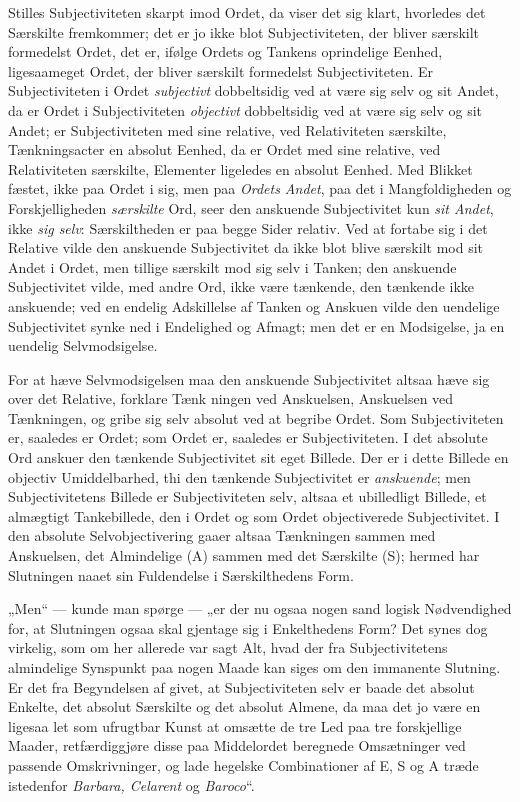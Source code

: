 \documentclass[12pt]{book}
\newcommand{\opage}[1]{\marginnote{\footnotesize\textit{[#1]}}}
\begin{document}
Stilles Subjectiviteten skarpt imod Ordet, da viser det sig klart, hvorledes det Særskilte fremkommer; det er jo ikke blot Subjectiviteten, der bliver særskilt formedelst Ordet, det er, ifølge Ordets og Tankens oprindelige Eenhed, ligesaameget Ordet, der bliver særskilt formedelst Subjectiviteten. Er Subjectiviteten i Ordet \emph{subjectivt} dobbeltsidig ved at være sig selv og sit Andet, da er Ordet i Subjectiviteten \emph{objectivt} dobbeltsidig ved at være sig selv og sit Andet; er Subjectiviteten med sine relative, ved Relativiteten særskilte, Tænkningsacter en absolut Eenhed, da er Ordet med sine relative, ved Relativiteten særskilte, Elementer ligeledes en absolut Eenhed. Med Blikket fæstet, ikke paa Ordet i sig, men paa \emph{Ordets Andet}, paa det i Mangfoldigheden og Forskjelligheden \emph{særskilte} Ord, seer den anskuende Subjectivitet kun \emph{sit Andet}, ikke \emph{sig selv}: Særskiltheden er paa begge Sider relativ. Ved at fortabe sig i det Relative vilde den anskuende Subjectivitet da ikke blot blive særskilt mod sit Andet i Ordet, men tillige særskilt mod sig selv i Tanken; den anskuende Subjectivitet vilde, med andre Ord, ikke være tænkende, den tænkende ikke anskuende; ved en endelig Adskillelse af Tanken og Anskuen vilde den uendelige Subjectivitet synke ned i Endelighed og Afmagt; men det er en Modsigelse, ja en uendelig Selvmodsigelse.

For at hæve Selvmodsigelsen maa den anskuende Subjectivitet altsaa hæve sig over det Relative, forklare Tænk%
\opage{341}ningen ved Anskuelsen, Anskuelsen ved Tænkningen, og gribe sig selv absolut ved at begribe Ordet. Som Subjectiviteten er, saaledes er Ordet; som Ordet er, saaledes er Subjectiviteten. I det absolute Ord anskuer den tænkende Subjectivitet sit eget Billede. Der er i dette Billede en objectiv Umiddelbarhed, thi den tænkende Subjectivitet er \emph{anskuende}; men Subjectivitetens Billede er Subjectiviteten selv, altsaa et ubilledligt Billede, et almægtigt Tankebillede, den i Ordet og som Ordet objectiverede Subjectivitet. I den absolute Selvobjectivering gaaer altsaa Tænkningen sammen med Anskuelsen, det Almindelige (A) sammen med det Særskilte (S); hermed har Slutningen naaet sin Fuldendelse i Særskilthedens Form.

„Men“ --- kunde man spørge --- „er der nu ogsaa nogen sand logisk Nødvendighed for, at Slutningen ogsaa skal gjentage sig i Enkelthedens Form? Det synes dog virkelig, som om her allerede var sagt Alt, hvad der fra Subjectivitetens almindelige Synspunkt paa nogen Maade kan siges om den immanente Slutning. Er det fra Begyndelsen af givet, at Subjectiviteten selv er baade det absolut Enkelte, det absolut Særskilte og det absolut Almene, da maa det jo være en ligesaa let som ufrugtbar Kunst at omsætte de tre Led paa tre forskjellige Maader, retfærdiggjøre disse paa Middelordet beregnede Omsætninger ved passende Omskrivninger, og lade hegelske Combinationer af E, S og A træde istedenfor \textit{Barbara, Celarent} og \textit{Baroco}“.
\end{document}
